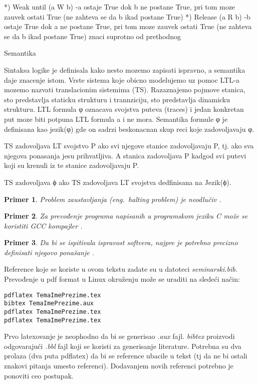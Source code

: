 \documentclass[a4paper]{article}
\newtheorem{primer}{Primer}[section]
\begin{document}
{*) Weak until (a W b) \newline
	-a ostaje True dok b ne postane True, pri tom moze zauvek ostati True (ne zahteva se da b ikad postane True) \newline
*) Release (a R b) \newline
	-b ostaje True dok a ne postane True, pri tom moze zauvek ostati True (ne zahteva se da b ikad postane True) znaci suprotno od prethodnog \newline

Semantika

Sintaksa logike je definisala kako nesto mozemo zapisati ispravno, a semantika daje znacenje istom.
Vrste sistema koje obicno modelujemo uz pomoc LTL-a mozemo nazvati translacionim sistemima (TS). Razaznajemo pojmove stanica, sto predstavlja staticku strukturu i trannziciju, sto predstavlja dinamicku strukturu.
LTL formula φ oznacava svojstva puteva (traces) i jedan konkretan put moze biti potpuna LTL formula a i ne mora.
Semantika formule φ je definisana kao jezik(φ) gde on sadrzi beskonacnan skup reci koje zadovoljavaju φ.

TS zadovoljava LT svojstvo P ako svi njegove stanice zadovoljavaju P, tj. ako sva njegova ponasanja jesu prihvatljiva. A stanica zadovoljava P kadgod svi putevi koji su krenuli iz te stanice zadovoljavaju P.

TS zadovoljava ϕ ako TS zadovoljava LT svojstva dedfinisana na Jezik(ϕ).
}

\begin{primer}
Problem zaustavljanja (eng.~{\em halting problem}) je neodlučiv \cite{haltingproblem}.
\end{primer}

\begin{primer}
Za prevođenje programa napisanih u programskom jeziku C može se koristiti GCC kompajler \cite{gcc}.
\end{primer}

\begin{primer}
 Da bi se ispitivala ispravost softvera, najpre je potrebno precizno definisati njegovo ponašanje \cite{laski2009software}. 
\end{primer}

Reference koje se koriste u ovom tekstu zadate su u datoteci {\em seminarski.bib}. Prevođenje u pdf format u Linux okruženju može se uraditi na sledeći način:
\begin{verbatim}
pdflatex TemaImePrezime.tex 
bibtex TemaImePrezime.aux 
pdflatex TemaImePrezime.tex 
pdflatex TemaImePrezime.tex 
\end{verbatim}
Prvo latexovanje je neophodno da bi se generisao {\em .aux} fajl. {\em bibtex} proizvodi odgovarajući {\em .bbl} fajl koji se koristi za generisanje literature. 
Potrebna su dva prolaza (dva puta pdflatex) da bi se reference ubacile u tekst (tj da ne bi ostali znakovi pitanja umesto referenci). Dodavanjem novih referenci potrebno je ponoviti ceo postupak.  
\end{document}

